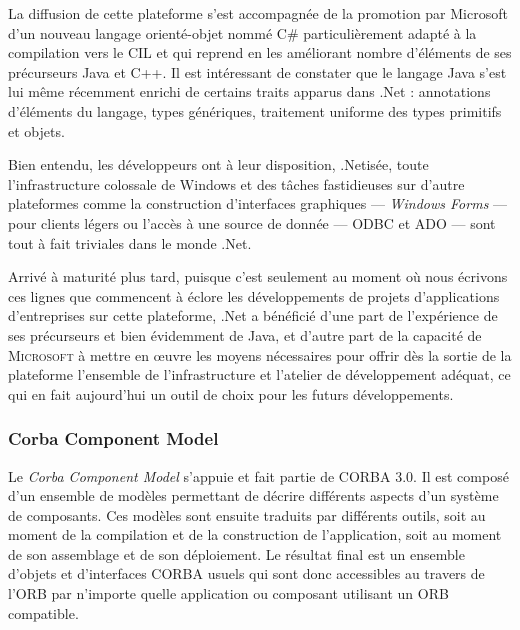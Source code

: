La diffusion de cette plateforme s'est accompagn\'ee de la promotion
par Microsoft d'un nouveau langage orient\'e-objet nomm\'e
\textsf{C\#} particuli\`erement adapt\'e \`a la compilation vers le
\textsf{CIL} et qui reprend en les am\'eliorant nombre
d'\'el\'ements de ses pr\'ecurseurs \textsf{Java} et
\textsf{C++}. Il est int\'eressant de constater que le langage \textsf{Java}
s'est lui m\^eme r\'ecemment  enrichi de certains traits apparus dans \textsf{.Net}  : annotations d'\'el\'ements du langage, types
g\'en\'eriques, traitement uniforme des types primitifs et objets.

Bien entendu, les d\'eveloppeurs ont \`a leur disposition,
\textsf{.Net}is\'ee, toute l'infrastructure colossale de
\textsf{Windows} et des t\^aches fastidieuses sur d'autre plateformes
comme la construction d'interfaces graphiques --- \emph{Windows Forms} --- pour clients l\'egers ou
l'acc\`es \`a une source de donn\'ee --- \textsf{ODBC} et \textsf{ADO} --- sont tout \`a fait triviales
dans le monde \textsf{.Net}.

Arriv\'e \`a maturit\'e plus tard, puisque c'est seulement au
moment o\`u nous \'ecrivons ces lignes que commencent \`a
\'eclore les d\'eveloppements de projets d'applications
d'entreprises sur cette plateforme, \textsf{.Net} a b\'en\'efici\'e d'une
part de l'exp\'erience de ses pr\'ecurseurs et bien \'evidemment de
\textsf{Java}, et d'autre part de la capacit\'e de \textsc{Microsoft} \`a mettre en
\oe uvre les moyens n\'ecessaires pour offrir d\`es la sortie de  la
plateforme l'ensemble de l'infrastructure et l'atelier de
d\'eveloppement ad\'equat, ce qui en fait aujourd'hui un outil de choix pour les
futurs d\'eveloppements.

\subsubsection{Corba Component Model}
\label{sec:ccm}
Le \emph{Corba Component Model}\cite{ccmspec} s'appuie et fait partie
 de \textsf{CORBA 3.0}\cite{corbaspec}. Il est compos\'e d'un
 ensemble de mod\`eles permettant de d\'ecrire diff\'erents aspects
 d'un syst\`eme de composants. Ces mod\`eles sont ensuite traduits
 par diff\'erents outils, soit au moment de la compilation et de la
 construction de l'application, soit au moment de son assemblage et de
 son d\'eploiement. Le r\'esultat final est  un ensemble d'objets et
 d'interfaces \textsf{CORBA} usuels qui sont donc
 accessibles au travers de l'\textsf{ORB} par n'importe quelle application ou
 composant utilisant un \textsf{ORB} compatible.

